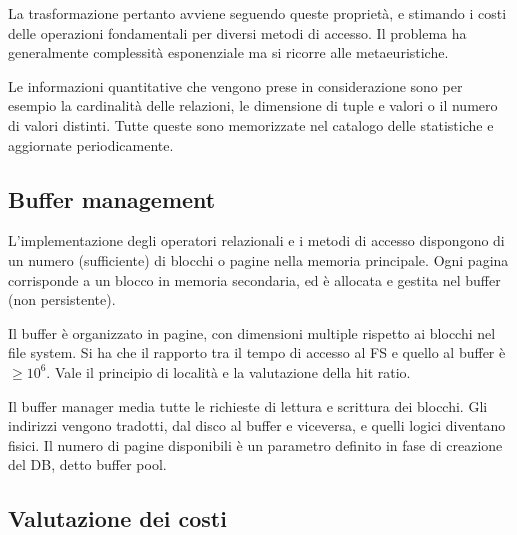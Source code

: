 La trasformazione pertanto avviene seguendo queste proprietà, e stimando i costi delle operazioni fondamentali per diversi metodi di accesso. Il problema ha generalmente complessità esponenziale ma si ricorre alle metaeuristiche. 

Le informazioni quantitative che vengono prese in considerazione sono per esempio la cardinalità delle relazioni, le dimensione di tuple e valori o il numero di valori distinti. Tutte queste sono memorizzate nel catalogo delle statistiche e aggiornate periodicamente. 

\subsection{Buffer management}
L'implementazione degli operatori relazionali e i metodi di accesso dispongono di un numero (sufficiente) di blocchi o pagine nella memoria principale. Ogni pagina corrisponde a un blocco in memoria secondaria, ed è allocata e gestita nel buffer (non persistente).

Il buffer è organizzato in pagine, con dimensioni multiple rispetto ai blocchi nel file system. Si ha che il rapporto tra il tempo di accesso al FS e quello al buffer è $\geq 10^6$. Vale il principio di località e la valutazione della hit ratio.

Il buffer manager media tutte le richieste di lettura e scrittura dei blocchi. Gli indirizzi vengono tradotti, dal disco al buffer e viceversa, e quelli logici diventano fisici. Il numero di pagine disponibili è un parametro definito in fase di creazione del DB, detto buffer pool.

\subsection{Valutazione dei costi}


